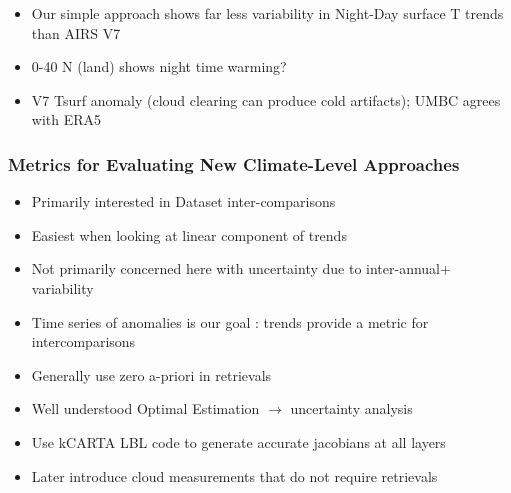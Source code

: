 \documentclass[10pt,t]{beamer}
\begin{document}
\begin{frame}
\begin{itemize}
\item Our simple approach shows far less variability in Night-Day surface T trends than AIRS V7
\item 0-40 N (land) shows night time warming?
\item V7 Tsurf anomaly (cloud clearing can produce cold artifacts); UMBC agrees with ERA5
\end{itemize}
\end{frame}
\begin{frame}
  \frametitle{Metrics for Evaluating New Climate-Level Approaches}
  \begin{itemize}
  \item Primarily interested in Dataset inter-comparisons 
  \item Easiest when looking at linear component of trends
  \item Not primarily concerned here with uncertainty due to inter-annual+ variability
  \item Time series of anomalies is our goal :  trends provide a metric for intercomparisons
  \item Generally use zero a-priori in retrievals
  \item Well understood Optimal Estimation $\rightarrow$ uncertainty analysis
  \item Use kCARTA LBL code to generate accurate jacobians at all layers
  \item Later introduce cloud measurements that do not require retrievals
  \end{itemize}
\end{frame}
\end{document}
